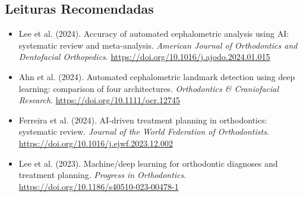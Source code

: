 \subsection*{Leituras Recomendadas}
\begin{itemize}
    \item Lee et al. (2024). Accuracy of automated cephalometric analysis using AI: systematic review and meta-analysis. \textit{American Journal of Orthodontics and Dentofacial Orthopedics}. \url{https://doi.org/10.1016/j.ajodo.2024.01.015}
    \item Ahn et al. (2024). Automated cephalometric landmark detection using deep learning: comparison of four architectures. \textit{Orthodontics \& Craniofacial Research}. \url{https://doi.org/10.1111/ocr.12745}
    \item Ferreira et al. (2024). AI-driven treatment planning in orthodontics: systematic review. \textit{Journal of the World Federation of Orthodontists}. \url{https://doi.org/10.1016/j.ejwf.2023.12.002}
    \item Lee et al. (2023). Machine/deep learning for orthodontic diagnoses and treatment planning. \textit{Progress in Orthodontics}. \url{https://doi.org/10.1186/s40510-023-00478-1}
\end{itemize}
